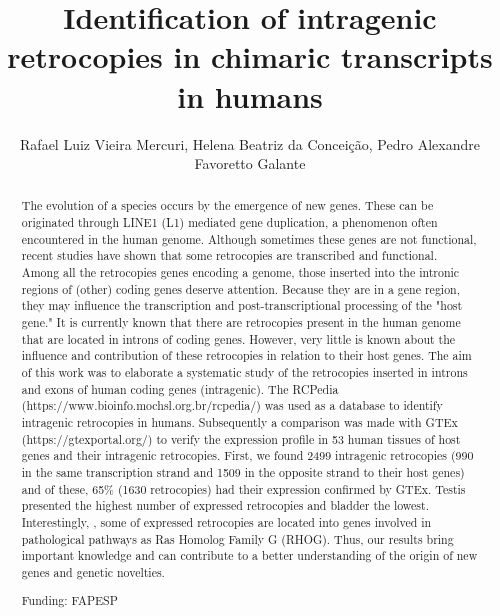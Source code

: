 \documentclass[twoside]{article}
\title{\vspace{-15mm}\fontsize{24pt}{10pt}\selectfont\textbf{ Identification of intragenic retrocopies in chimaric transcripts in humans }} %
\author{ Rafael Luiz Vieira Mercuri, Helena Beatriz da Concei\c{c}\~ao, Pedro Alexandre Favoretto Galante }
\affil{ Instituto de Ensino e Pesquisa,  Hospital S\'{\i}rio-Liban\^es }
\date{}
\begin{document}
  
  
  \maketitle %
  
  
  \thispagestyle{fancy} %
  
  
  \begin{abstract}
  The evolution of a species occurs by the emergence of new genes. These can be originated through LINE1 (L1) mediated gene duplication,  a phenomenon often encountered in the human genome. Although sometimes these genes are not functional,  recent studies have shown that some retrocopies are transcribed and functional. Among all the retrocopies genes encoding a genome,  those inserted into the intronic regions of (other) coding genes deserve attention. Because they are in a gene region,  they may influence the transcription and post-transcriptional processing of the "host gene." It is currently known that there are retrocopies present in the human genome that are located in introns of coding genes. However,  very little is known about the influence and contribution of these retrocopies in relation to their host genes. The aim of this work was to elaborate a systematic study of the retrocopies inserted in introns and exons of human coding genes (intragenic). The RCPedia (https://www.bioinfo.mochsl.org.br/rcpedia/) was used as a database to identify intragenic retrocopies in humans. Subsequently a comparison was made with GTEx (https://gtexportal.org/) to verify the expression profile in 53 human tissues of host genes and their intragenic retrocopies. First,  we found 2499 intragenic retrocopies (990 in the same transcription strand and 1509 in the opposite strand to their host genes) and of these,  65\% (1630 retrocopies) had their expression confirmed by GTEx. Testis presented the highest number of expressed retrocopies and bladder the lowest. Interestingly,  ,  some of expressed retrocopies are located into genes involved in pathological pathways as Ras Homolog Family G (RHOG). Thus,  our results bring important knowledge and can contribute to a better understanding of the origin of new genes and genetic novelties.
  
  Funding: FAPESP \\ 
  \end{abstract}
  
\end{document}

